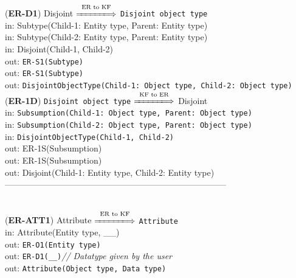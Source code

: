 \documentclass[sn-mathphys]{sn-jnl}
\begin{document}
{{{({\bf ER-D1}) {Disjoint} $\overset{\text{ER to KF}}{\xLongrightarrow{\hspace*{1.4cm}}}$ {\tt Disjoint object type}\\
\hspace*{0.3cm}in: {Subtype(Child-1: Entity type, Parent: Entity type)} \\
\hspace*{0.3cm}in: {Subtype(Child-2: Entity type, Parent: Entity type)} \\
\hspace*{0.3cm}in: {Disjoint(Child-1, Child-2)} \\
\hspace*{0.5cm}out:  {\tt ER-S1(Subtype)}\\
\hspace*{0.5cm}out:  {\tt ER-S1(Subtype)}\\
\hspace*{0.5cm}out:  {\tt DisjointObjectType(Child-1: Object type, Child-2: Object type)}\\

({\bf ER-1D}) {\tt Disjoint object type} $\overset{\text{KF to ER}}{\xLongrightarrow{\hspace*{1.4cm}}}$ {Disjoint}\\
\hspace*{0.3cm}in: {\tt Subsumption(Child-1: Object type, Parent: Object type)} \\
\hspace*{0.3cm}in: {\tt Subsumption(Child-2: Object type, Parent: Object type)} \\
\hspace*{0.3cm}in: {\tt DisjointObjectType(Child-1, Child-2)} \\
\hspace*{0.5cm}out:  {ER-1S(Subsumption)}\\
\hspace*{0.5cm}out:  {ER-1S(Subsumption)}\\
\hspace*{0.5cm}out:  {Disjoint(Child-1: Entity type, Child-2: Entity type)}\\

------------------------------------------------------------------------------
\\ \

({\bf ER-ATT1}) {Attribute} $\overset{\text{ER to KF}}{\xLongrightarrow{\hspace*{1.4cm}}}$ {\tt Attribute}\\
\hspace*{0.3cm}in: Attribute(Entity type, \_\_)\\
\hspace*{0.5cm}out:  {\tt ER-O1(Entity type)} \\
\hspace*{0.5cm}out:  {\tt ER-D1(\_\_)}\hfill {\it // Datatype given by the user}\\
\hspace*{0.5cm}out:  {\tt Attribute(Object type, Data type)}\\

}}}
\end{document}
